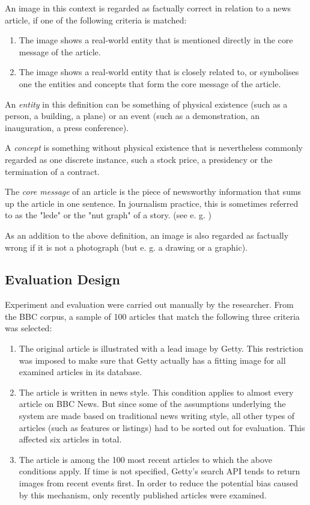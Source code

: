 \documentclass[11pt,a4paper,twoside]{article}
\begin{document}
An image in this context is regarded as factually correct in relation to a news article, if one of the following criteria is matched:

\begin{enumerate}
    \item The image shows a real-world entity that is mentioned directly in the core message of the article.
    \item The image shows a real-world entity that is closely related to, or symbolises one the entities and concepts that form the core message of the article.
\end{enumerate}

An \emph{entity} in this definition can be something of physical existence (such as a person, a building, a plane) or an event (such as a demonstration, an inauguration, a press conference).

A \emph{concept} is something without physical existence that is nevertheless commonly regarded as one discrete instance, such a stock price, a presidency or the termination of a contract.

The \emph{core message} of an article is the piece of newsworthy information that sums up the article in one sentence. In journalism practice, this is sometimes referred to as the "lede" or the "nut graph" of a story. (see e. g. \cite[p. 110]{Rich2015WritingMethod})

As an addition to the above definition, an image is also regarded as factually wrong if it is not a photograph (but e. g. a drawing or a graphic).

\subsection{Evaluation Design} \label{EvalDesign}

Experiment and evaluation were carried out manually by the researcher. From the BBC corpus, a sample of 100 articles that match the following three criteria was selected:

\begin{enumerate}
    \item The original article is illustrated with a lead image by Getty. This restriction was imposed to make sure that Getty actually has a fitting image for all examined articles in its database.
    \item The article is written in news style. This condition applies to almost every article on BBC News. But since some of the assumptions underlying the system are made based on traditional news writing style, all other types of articles (such as features or listings) had to be sorted out for evaluation. This affected six articles in total.
    \item The article is among the 100 most recent articles to which the above conditions apply. If time is not specified, Getty's search API tends to return images from recent events first. In order to reduce the potential bias caused by this mechanism, only recently published articles were examined.
\end{enumerate}
\end{document}

